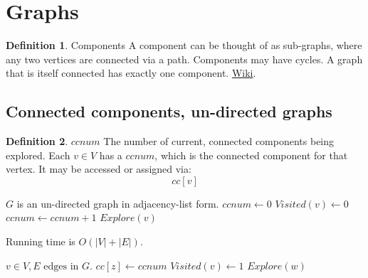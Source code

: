 \documentclass{article}
\theoremstyle{definition}
\newtheorem{definition}{Definition}[section]
\begin{document}
	
\tableofcontents
\listofalgorithms
\section{Graphs}

\begin{definition}{Components}
	A component can be thought of as sub-graphs, where any two vertices are connected via a path. Components may have cycles. A graph that is itself connected has exactly one component.
	\href{https://en.wikipedia.org/wiki/Component_(graph_theory)}{Wiki}. 
\end{definition}

\subsection{Connected components, un-directed graphs}
\label{cc_und}

\begin{definition}{$ccnum$}
The number of current, connected components being explored. Each $v \in V$ has a $ccnum$, which is the connected component for that vertex. It may be accessed or assigned via:
$$cc[v]$$
\end{definition}

\begin{algorithm}[H]
\caption{$DFS(G)$: Given vertices $V$ in graph $G$, find all strongly connected components.}
\label{alg:dfs_und}
\begin{algorithmic}[1]
\REQUIRE $G$ is an un-directed graph in adjacency-list form.
\STATE $ccnum \gets 0$
\STATE $Visited(v) \gets 0$
\ENDFOR
{}
	\STATE $ccnum \gets ccnum + 1$
	\STATE $Explore(v)$
\ENDIF
\ENDFOR
\end{algorithmic}
 Running time is $O(|V|+|E|)$.
\end{algorithm}

\begin{algorithm}[H]
\caption{$Explore(v)$}
\label{alg:dfs_und_exp}
\begin{algorithmic}[1]
\REQUIRE $v \in V, E \text{ edges in } G$.
\STATE $cc[z] \gets ccnum$  
\STATE $Visited(v) \gets 1$
	\STATE $Explore(w)$
\ENDIF
\ENDFOR
\end{algorithmic}
\end{algorithm}
\end{document}
